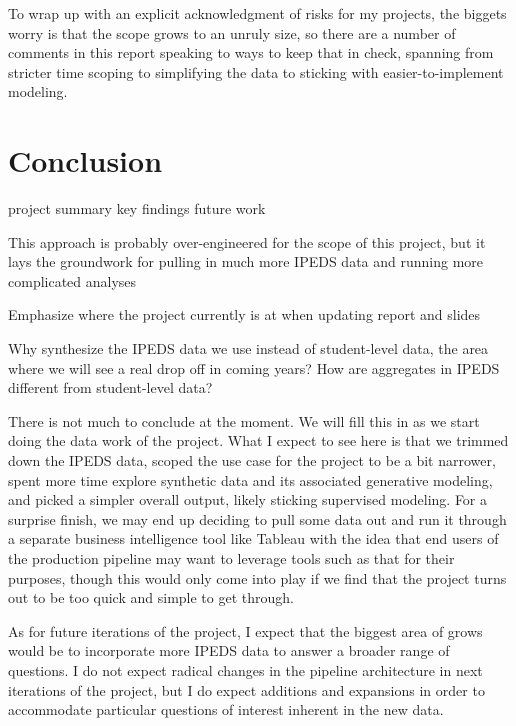\documentclass[sigconf, authorversion, nonacm]{acmart}
\begin{document}
    To wrap up with an explicit acknowledgment of risks for my projects, the biggets worry is that the scope grows to an unruly size, so there are a number of comments in this report speaking to ways to keep that in check, spanning from stricter time scoping to simplifying the data to sticking with easier-to-implement modeling.


\section{Conclusion}


    project summary
    key findings
    future work

    This approach is probably over-engineered for the scope of this project, but it lays the groundwork for pulling in much more IPEDS data and running more complicated analyses

    Emphasize where the project currently is at when updating report and slides

    Why synthesize the IPEDS data we use instead of student-level data, the area where we will see a real drop off in coming years? How are aggregates in IPEDS different from student-level data?




    There is not much to conclude at the moment. We will fill this in as we start doing the data work of the project. What I expect to see here is that we trimmed down the IPEDS data, scoped the use case for the project to be a bit narrower, spent more time explore synthetic data and its associated generative modeling, and picked a simpler overall output, likely sticking supervised modeling. For a surprise finish, we may end up deciding to pull some data out and run it through a separate business intelligence tool like Tableau with the idea that end users of the production pipeline may want to leverage tools such as that for their purposes, though this would only come into play if we find that the project turns out to be too quick and simple to get through.

    As for future iterations of the project, I expect that the biggest area of grows would be to incorporate more IPEDS data to answer a broader range of questions. I do not expect radical changes in the pipeline architecture in next iterations of the project, but I do expect additions and expansions in order to accommodate particular questions of interest inherent in the new data.




\end{document}
